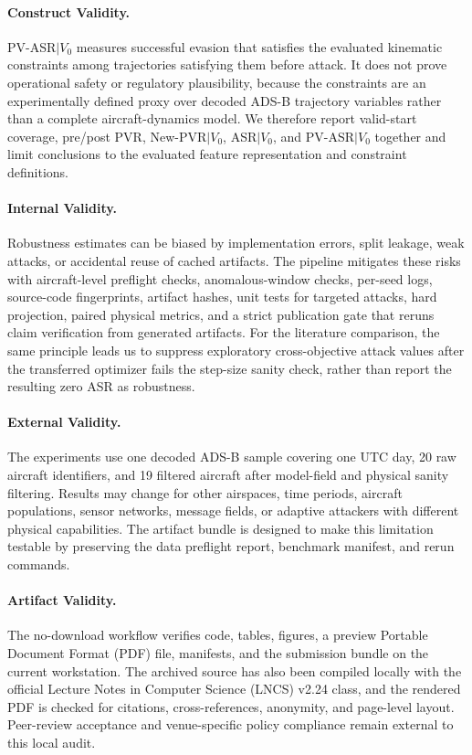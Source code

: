 \documentclass[runningheads]{llncs}
\begin{document}
\paragraph{Construct Validity.}
PV-ASR$\mid V_0$ measures successful evasion that satisfies the evaluated kinematic constraints among trajectories satisfying them before attack.
It does not prove operational safety or regulatory plausibility, because the constraints are an experimentally defined proxy over decoded ADS-B trajectory variables rather than a complete aircraft-dynamics model.
We therefore report valid-start coverage, pre/post PVR, New-PVR$\mid V_0$, ASR$\mid V_0$, and PV-ASR$\mid V_0$ together and limit conclusions to the evaluated feature representation and constraint definitions.

\paragraph{Internal Validity.}
Robustness estimates can be biased by implementation errors, split leakage, weak attacks, or accidental reuse of cached artifacts.
The pipeline mitigates these risks with aircraft-level preflight checks, anomalous-window checks, per-seed logs, source-code fingerprints, artifact hashes, unit tests for targeted attacks, hard projection, paired physical metrics, and a strict publication gate that reruns claim verification from generated artifacts.
For the literature comparison, the same principle leads us to suppress exploratory cross-objective attack values after the transferred optimizer fails the step-size sanity check, rather than report the resulting zero ASR as robustness.

\paragraph{External Validity.}
The experiments use one decoded ADS-B sample covering one UTC day, 20 raw aircraft identifiers, and 19 filtered aircraft after model-field and physical sanity filtering.
Results may change for other airspaces, time periods, aircraft populations, sensor networks, message fields, or adaptive attackers with different physical capabilities.
The artifact bundle is designed to make this limitation testable by preserving the data preflight report, benchmark manifest, and rerun commands.

\paragraph{Artifact Validity.}
The no-download workflow verifies code, tables, figures, a preview Portable Document Format (PDF) file, manifests, and the submission bundle on the current workstation.
The archived source has also been compiled locally with the official Lecture Notes in Computer Science (LNCS) v2.24 class, and the rendered PDF is checked for citations, cross-references, anonymity, and page-level layout.
Peer-review acceptance and venue-specific policy compliance remain external to this local audit.
\end{document}
